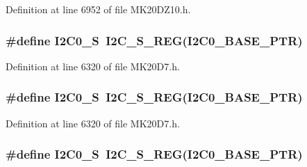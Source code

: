 Definition at line 6952 of file M\+K20\+D\+Z10.\+h.

\subsubsection[{\texorpdfstring{I2\+C0\+\_\+S}{I2C0_S}}]{\setlength{\rightskip}{0pt plus 5cm}\#define I2\+C0\+\_\+S~{\bf I2\+C\+\_\+\+S\+\_\+\+R\+EG}({\bf I2\+C0\+\_\+\+B\+A\+S\+E\+\_\+\+P\+TR})}\hypertarget{group___i2_c___register___accessor___macros_ga1a4918e7df76e7488707db427ebfaead}{}\label{group___i2_c___register___accessor___macros_ga1a4918e7df76e7488707db427ebfaead}


Definition at line 6320 of file M\+K20\+D7.\+h.

\subsubsection[{\texorpdfstring{I2\+C0\+\_\+S}{I2C0_S}}]{\setlength{\rightskip}{0pt plus 5cm}\#define I2\+C0\+\_\+S~{\bf I2\+C\+\_\+\+S\+\_\+\+R\+EG}({\bf I2\+C0\+\_\+\+B\+A\+S\+E\+\_\+\+P\+TR})}\hypertarget{group___i2_c___register___accessor___macros_ga1a4918e7df76e7488707db427ebfaead}{}\label{group___i2_c___register___accessor___macros_ga1a4918e7df76e7488707db427ebfaead}


Definition at line 6320 of file M\+K20\+D7.\+h.

\subsubsection[{\texorpdfstring{I2\+C0\+\_\+S}{I2C0_S}}]{\setlength{\rightskip}{0pt plus 5cm}\#define I2\+C0\+\_\+S~{\bf I2\+C\+\_\+\+S\+\_\+\+R\+EG}({\bf I2\+C0\+\_\+\+B\+A\+S\+E\+\_\+\+P\+TR})}\hypertarget{group___i2_c___register___accessor___macros_ga1a4918e7df76e7488707db427ebfaead}{}\label{group___i2_c___register___accessor___macros_ga1a4918e7df76e7488707db427ebfaead}


